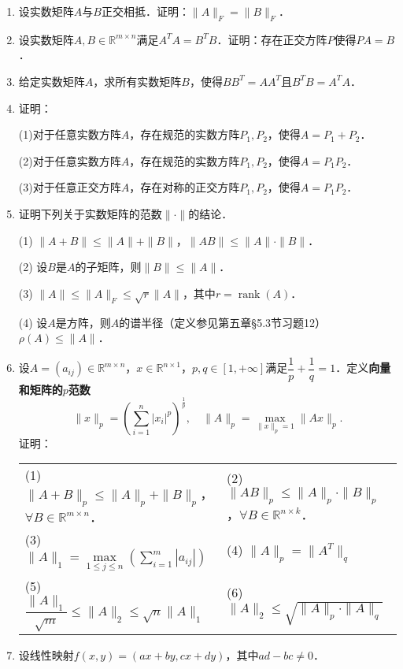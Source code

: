 \documentclass[a4paper,fontset=windows]{ctexbook}
\theoremstyle{definition}
\DeclareMathOperator{\rank}{rank}
\renewcommand{\le}{\leqslant}
\begin{document}
\begin{enumerate}
\item 设实数矩阵$A$与$B$正交相抵．证明：$\|A\|_F=\|B\|_F$．

\item 设实数矩阵$A,B\in\mathbb{R}^{m\times n}$满足$A^TA=B^TB$．证明：存在正交方阵$P$使得$PA=B$．

\item 给定实数矩阵$A$，求所有实数矩阵$B$，使得$BB^T=AA^T$且$B^TB=A^TA$．

\item 证明：

(1)对于任意实数方阵$A$，存在规范的实数方阵$P_1,P_2$，使得$A=P_1+P_2$．

(2)对于任意实数方阵$A$，存在规范的实数方阵$P_1,P_2$，使得$A=P_1P_2$．

(3)对于任意正交方阵$A$，存在对称的正交方阵$P_1,P_2$，使得$A=P_1P_2$．

\item 证明下列关于实数矩阵的范数$\|\cdot\|$的结论．

(1) $\|A+B\|\le\|A\|+\|B\|$，$\|AB\|\le\|A\|\cdot\|B\|$．

(2) 设$B$是$A$的子矩阵，则$\|B\|\le\|A\|$．

(3) $\|A\|\le\|A\|_F\le\sqrt{r}\|A\|$，其中$r=\rank(A)$．

(4) 设$A$是方阵，则$A$的谱半径（定义参见第五章\S 5.3节习题12）$\rho(A)\le\|A\|$．

\item 设$A=(a_{ij})\in\mathbb{R}^{m\times n}$，$x\in\mathbb{R}^{n\times 1}$，$p,q\in[1,+\infty]$满足$\dfrac{1}{p}+\dfrac{1}{q}=1$．定义{\bf 向量和矩阵的$p$范数}
$$\|x\|_p=\left(\sum_{i=1}^n|x_i|^p\right)^{\frac{1}{p}},\quad\|A\|_p=\max\limits_{\|x\|_p=1}\|Ax\|_p.$$
证明：

\hspace*{-6pt}\begin{tabular}{l@{\qquad}l}
(1) $\|A+B\|_p\le\|A\|_p+\|B\|_p$，$\forall B\in\mathbb{R}^{m\times n}$．&
(2) $\|AB\|_p\le\|A\|_p\cdot\|B\|_p$，$\forall B\in\mathbb{R}^{n\times k}$．\\
(3) $\|A\|_1=\max\limits_{1\le j\le n}\left(\sum\limits_{i=1}^m|a_{ij}|\right)$ &
(4) $\|A\|_p=\|A^T\|_q$ \\
(5) $\dfrac{\|A\|_1}{\sqrt{m}}\le\|A\|_2\le\sqrt{n}\|A\|_1$ &
(6) $\|A\|_2\le\sqrt{\|A\|_p\cdot\|A\|_q}$
\end{tabular}

\item 设线性映射$f(x,y)=(ax+by,cx+dy)$，其中$ad-bc\ne 0$．


\end{enumerate}
\end{document}
